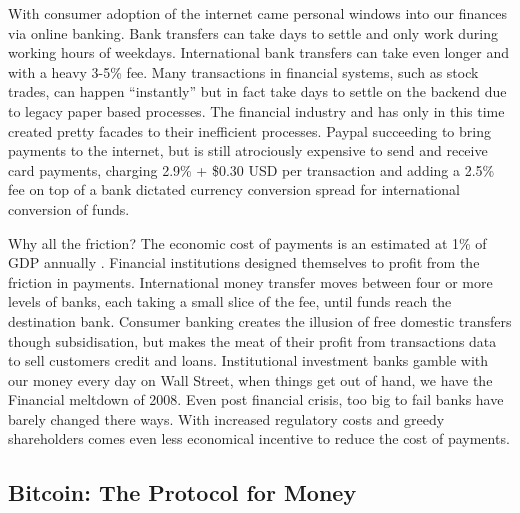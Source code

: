 \documentclass[12pt]{article} %
\begin{document}
With consumer adoption of the internet came personal windows into our finances via online banking. Bank transfers can take days to settle and only work during working hours of weekdays. International bank transfers can take even longer and with a heavy 3-5\% fee.  Many transactions in financial systems, such as stock trades, can happen ``instantly'' but in fact take days to settle on the backend due to legacy paper based processes.  The financial industry and has only in this time created pretty facades to their inefficient processes. Paypal succeeding to bring payments to the internet, but is still atrociously expensive to send and receive card payments, charging 2.9\% + \$0.30 USD per transaction and adding a 2.5\% fee on top of a bank dictated currency conversion spread for international conversion of funds\cite{paypal2017fees}.


Why all the friction? The economic cost of payments is an estimated at 1\% of GDP annually \cite{kaarmann2013cost}. Financial institutions designed themselves to profit from the friction in payments. International money transfer moves between four or more levels of banks, each taking a small slice of the fee, until funds reach the destination bank. Consumer banking creates the illusion of free domestic transfers though subsidisation, but makes the meat of their profit from transactions data to sell customers credit and loans. Institutional investment banks gamble with our money every day on Wall Street, when things get out of hand, we have the Financial meltdown of 2008. Even post financial crisis, too big to fail banks have barely changed there ways. With increased regulatory costs and greedy shareholders comes even less economical incentive to reduce the cost of payments.

\subsection{Bitcoin: The Protocol for Money}
\end{document}

